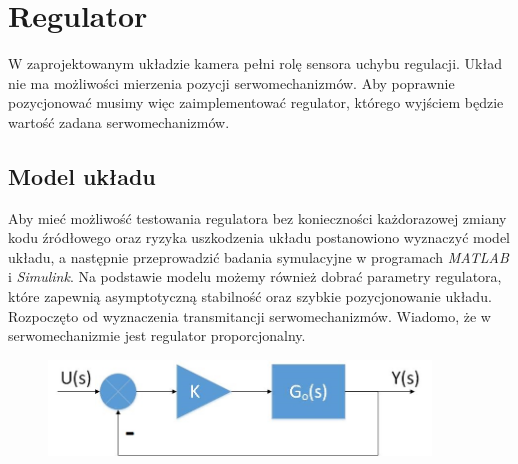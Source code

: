 \chapter{Regulator}
\label{cha:regulator}

W zaprojektowanym układzie kamera pełni rolę sensora uchybu regulacji. Układ nie ma możliwości mierzenia pozycji serwomechanizmów. Aby poprawnie pozycjonować musimy więc zaimplementować regulator, którego wyjściem będzie wartość zadana serwomechanizmów.

\section{Model układu}
\label{sec:modelukladu}

Aby mieć możliwość testowania regulatora bez konieczności każdorazowej zmiany kodu źródłowego oraz ryzyka uszkodzenia układu postanowiono wyznaczyć model układu, a następnie przeprowadzić badania symulacyjne w programach \textit{MATLAB} i \textit{Simulink}. Na podstawie modelu możemy również dobrać parametry regulatora, które zapewnią asymptotyczną stabilność oraz szybkie pozycjonowanie układu. Rozpoczęto od wyznaczenia transmitancji serwomechanizmów. Wiadomo, że w serwomechanizmie jest regulator proporcjonalny.

\begin{figure}[h]
	\centering
	\includegraphics[width=4in]{servo.jpg}
\end{figure}

